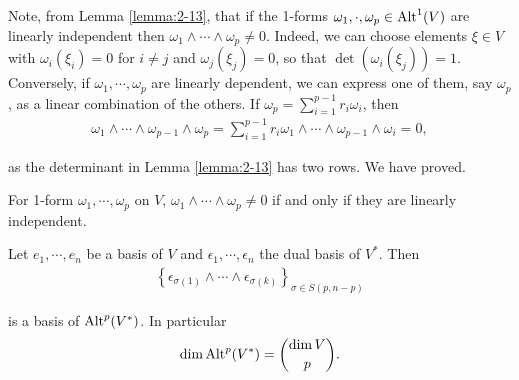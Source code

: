 Note, from Lemma \ref{lemma:2-13}, that if the 1-forms $\omega_1, \cdot, \omega_p\in\operatorname{Alt}^1(V)$ 
are linearly independent then $\omega_1\wedge\cdots\wedge\omega_p\neq 0$. Indeed, we can choose 
elements $\xi\in V$ with $\omega_i(\xi_i) = 0$ for $i\neq j$ and $\omega_j(\xi_j) = 0$, so that 
$\det(\omega_i(\xi_j)) = 1$. Conversely, if $\omega_1, \cdots, \omega_p$ are linearly dependent,
we can express one of them, say $\omega_p$, as a linear combination of the others. If 
$\omega_p = \sum_{i=1}^{p-1}{r_i\omega_i}$, then
\begin{align*}
  \omega_{1}\wedge\cdots\wedge\omega_{p-1}\wedge\omega_{p}
  = \sum_{i=1}^{p-1}r_{i}\omega_{1}\wedge\cdots\wedge\omega_{p-1}\wedge\omega_{i}=0,
\end{align*}

as the determinant in Lemma \ref{lemma:2-13} has two rows. We have proved.



\begin{lemma}
  For 1-form $\omega_1, \cdots, \omega_p$ on $V$, $\omega_1\wedge\cdots\wedge\omega_p \neq 0$ if and only if
  they are linearly independent.
\end{lemma}

\begin{theorem}\label{theorem:2-15}
Let $e_1, \cdots, e_n$ be a basis of $V$ and $\epsilon_1, \cdots, \epsilon_n$ the dual basis of $V^*$. Then 
\begin{align*}
  \left\{\epsilon_{\sigma(1)}\wedge\cdots\wedge\epsilon_{\sigma(k)}\right\}_{\sigma\in S(p, n-p)}
\end{align*}

is a basis of $\operatorname{Alt}^p(V^*)$. In particular
\begin{align*}
  \dim\operatorname{Alt}^p(V^*) = \binom{\dim V}{p}.
\end{align*}
\end{theorem}

